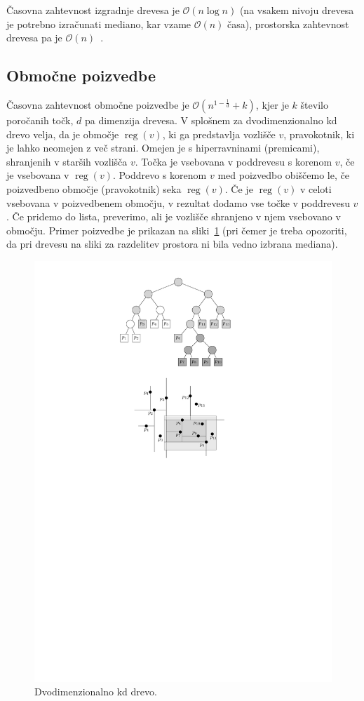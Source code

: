 \documentclass[a4paper, 12pt]{book}
\newcommand{\OO}{\ensuremath{\mathcal{O}}} %
\begin{document}
Časovna zahtevnost izgradnje drevesa je $\OO(n\log n)$ (na vsakem nivoju drevesa je potrebno izračunati mediano, kar vzame $\OO(n)$ časa), prostorska zahtevnost drevesa pa je $\OO(n)$~\cite[poglavje~5.2]{bkos-08-all}.
\subsection{Območne poizvedbe}
Časovna zahtevnost območne poizvedbe je $\OO(n^{1-\frac{1}{d}} + k)$, kjer je $k$ število poročanih točk, $d$ pa dimenzija drevesa. V splošnem za dvodimenzionalno kd drevo velja, da je območje $\operatorname{reg}(v)$, ki ga predstavlja vozlišče $v$, pravokotnik, ki je lahko neomejen z več strani. Omejen je s hiperravninami (premicami), shranjenih v starših vozlišča $v$. Točka je vsebovana v poddrevesu s korenom $v$, če je vsebovana v $\operatorname{reg}(v)$. Poddrevo s korenom $v$ med poizvedbo obiščemo le, če poizvedbeno območje (pravokotnik) seka $\operatorname{reg}(v)$. Če
je $\operatorname{reg}(v)$ v celoti vsebovana v poizvedbenem območju, v rezultat dodamo vse točke v poddrevesu $v$. Če pridemo do lista, preverimo, ali je vozlišče shranjeno v njem vsebovano v območju. Primer poizvedbe je prikazan na sliki~\ref{kd-primer} (pri čemer je treba opozoriti, da pri drevesu na sliki za razdelitev prostora ni bila vedno izbrana mediana).

\begin{figure}[htp]
\centerline{\includegraphics[scale=1.2]{pics/kdTree4.pdf}}		
\caption{Dvodimenzionalno kd drevo.}		
\label{kd-primer}		
\end{figure}
\end{document}
